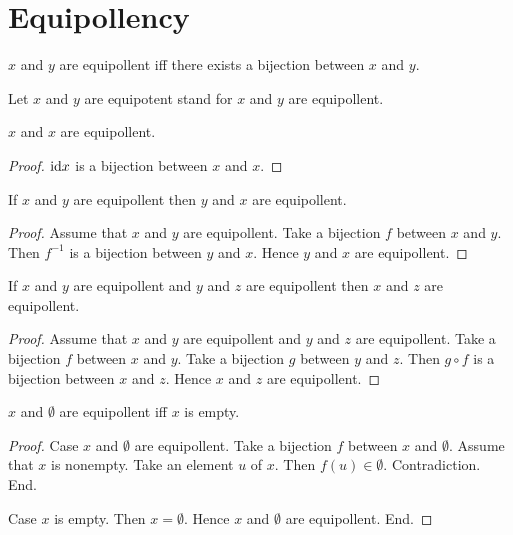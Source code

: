 \documentclass[../../basic-notions.ftl.tex]{subfiles}
\begin{document}
  \section{Equipollency}

  \begin{forthel}
    \begin{definition}
      $x$ and $y$ are equipollent iff there exists a bijection between $x$ and $y$.
    \end{definition}

    Let $x$ and $y$ are equipotent stand for $x$ and $y$ are equipollent.

    \begin{proposition}[SF 01 07 639059]
      $x$ and $x$ are equipollent.
    \end{proposition}
    \begin{proof}
      $\text{id}{x}$ is a bijection between $x$ and $x$.
    \end{proof}

    \begin{proposition}[SF 01 07 467393]
      If $x$ and $y$ are equipollent then $y$ and $x$ are equipollent.
    \end{proposition}
    \begin{proof}
      Assume that $x$ and $y$ are equipollent.
      Take a bijection $f$ between $x$ and $y$.
      Then $f^{-1}$ is a bijection between $y$ and $x$.
      Hence $y$ and $x$ are equipollent.
    \end{proof}

    \begin{proposition}[SF 01 07 956273]
      If $x$ and $y$ are equipollent and $y$ and $z$ are equipollent then $x$ and $z$ are equipollent.
    \end{proposition}
    \begin{proof}
      Assume that $x$ and $y$ are equipollent and $y$ and $z$ are equipollent.
      Take a bijection $f$ between $x$ and $y$.
      Take a bijection $g$ between $y$ and $z$.
      Then $g \circ f$ is a bijection between $x$ and $z$.
      Hence $x$ and $z$ are equipollent.
    \end{proof}

    \begin{proposition}[SF 01 07 430789]
      $x$ and $\emptyset$ are equipollent iff $x$ is empty.
    \end{proposition}
    \begin{proof}
      Case $x$ and $\emptyset$ are equipollent.
        Take a bijection $f$ between $x$ and $\emptyset$.
        Assume that $x$ is nonempty.
        Take an element $u$ of $x$.
        Then $f(u) \in \emptyset$.
        Contradiction.
      End.

      Case $x$ is empty.
        Then $x = \emptyset$.
        Hence $x$ and $\emptyset$ are equipollent.
      End.
    \end{proof}
  \end{forthel}
\end{document}
